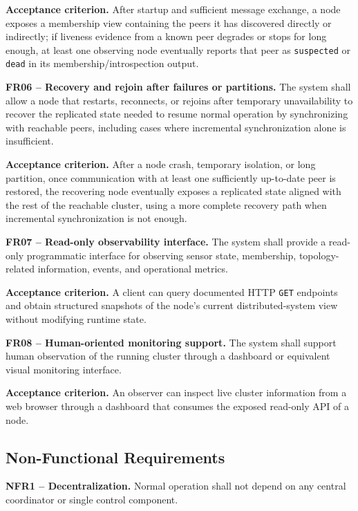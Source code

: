 \textbf{Acceptance criterion.}
After startup and sufficient message exchange, a node exposes a membership view containing the peers it has discovered directly or indirectly; if liveness evidence from a known peer degrades or stops for long enough, at least one observing node eventually reports that peer as \texttt{suspected} or \texttt{dead} in its membership/introspection output.

\medskip
\textbf{FR06 -- Recovery and rejoin after failures or partitions.}
The system shall allow a node that restarts, reconnects, or rejoins after temporary unavailability to recover the replicated state needed to resume normal operation by synchronizing with reachable peers, including cases where incremental synchronization alone is insufficient.

\textbf{Acceptance criterion.}
After a node crash, temporary isolation, or long partition, once communication with at least one sufficiently up-to-date peer is restored, the recovering node eventually exposes a replicated state aligned with the rest of the reachable cluster, using a more complete recovery path when incremental synchronization is not enough.

\medskip
\textbf{FR07 -- Read-only observability interface.}
The system shall provide a read-only programmatic interface for observing sensor state, membership, topology-related information, events, and operational metrics.

\textbf{Acceptance criterion.}
A client can query documented HTTP \texttt{GET} endpoints and obtain structured snapshots of the node's current distributed-system view without modifying runtime state.

\medskip
\textbf{FR08 -- Human-oriented monitoring support.}
The system shall support human observation of the running cluster through a dashboard or equivalent visual monitoring interface.

\textbf{Acceptance criterion.}
An observer can inspect live cluster information from a web browser through a dashboard that consumes the exposed read-only API of a node.

\subsection{Non-Functional Requirements}
\label{non-functional-requirements}

\textbf{NFR1 -- Decentralization.}
Normal operation shall not depend on any central coordinator or single control component.

